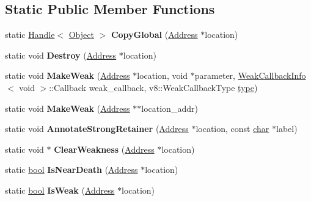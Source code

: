 \subsection*{Static Public Member Functions}
\begin{DoxyCompactItemize}
\item 
\mbox{\label{classv8_1_1internal_1_1GlobalHandles_aa602be11a1bc9a7330847643f0da5b8e}} 
static \mbox{\hyperlink{classv8_1_1internal_1_1Handle}{Handle}}$<$ \mbox{\hyperlink{classv8_1_1internal_1_1Object}{Object}} $>$ {\bfseries Copy\+Global} (\mbox{\hyperlink{classuintptr__t}{Address}} $\ast$location)
\item 
\mbox{\label{classv8_1_1internal_1_1GlobalHandles_a1a31391c097b88af06b7e0cf673bcf00}} 
static void {\bfseries Destroy} (\mbox{\hyperlink{classuintptr__t}{Address}} $\ast$location)
\item 
\mbox{\label{classv8_1_1internal_1_1GlobalHandles_aba8a4005e8af1b131ee9dd35a05277f3}} 
static void {\bfseries Make\+Weak} (\mbox{\hyperlink{classuintptr__t}{Address}} $\ast$location, void $\ast$parameter, \mbox{\hyperlink{classv8_1_1WeakCallbackInfo}{Weak\+Callback\+Info}}$<$ void $>$\+::Callback weak\+\_\+callback, v8\+::\+Weak\+Callback\+Type \mbox{\hyperlink{classstd_1_1conditional_1_1type}{type}})
\item 
\mbox{\label{classv8_1_1internal_1_1GlobalHandles_a9d9ae4618105297a4f6ec6a087feaa60}} 
static void {\bfseries Make\+Weak} (\mbox{\hyperlink{classuintptr__t}{Address}} $\ast$$\ast$location\+\_\+addr)
\item 
\mbox{\label{classv8_1_1internal_1_1GlobalHandles_a344f421b639960957cddf519e33e80e7}} 
static void {\bfseries Annotate\+Strong\+Retainer} (\mbox{\hyperlink{classuintptr__t}{Address}} $\ast$location, const \mbox{\hyperlink{classchar}{char}} $\ast$label)
\item 
\mbox{\label{classv8_1_1internal_1_1GlobalHandles_a1217999e7546b3aa6d8fc1d90d870dbf}} 
static void $\ast$ {\bfseries Clear\+Weakness} (\mbox{\hyperlink{classuintptr__t}{Address}} $\ast$location)
\item 
\mbox{\label{classv8_1_1internal_1_1GlobalHandles_a526596b238a7cb246f980354a9a7fca1}} 
static \mbox{\hyperlink{classbool}{bool}} {\bfseries Is\+Near\+Death} (\mbox{\hyperlink{classuintptr__t}{Address}} $\ast$location)
\item 
\mbox{\label{classv8_1_1internal_1_1GlobalHandles_a9acf76cddd5d89af57a42ddb74ad7948}} 
static \mbox{\hyperlink{classbool}{bool}} {\bfseries Is\+Weak} (\mbox{\hyperlink{classuintptr__t}{Address}} $\ast$location)
\end{DoxyCompactItemize}
